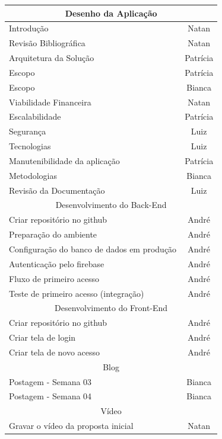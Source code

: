 \begin{apendicesenv}
\begin{quadro}[htb]
\begin{tabular}{|l|c|}
    \multicolumn{2}{|c|}{Desenho da Aplicação} \\ \hline
    Introdução  & Natan  \\ \hline 
    Revisão Bibliográfica  & Natan  \\ \hline 
    Arquitetura da Solução  & Patrícia   \\ \hline 
    Escopo  & Patrícia  \\ \hline 
    Escopo  & Bianca   \\ \hline 
    Viabilidade Financeira  & Natan  \\ \hline 
    Escalabilidade  & Patrícia  \\ \hline 
    Segurança  & Luiz  \\ \hline 
    Tecnologias  & Luiz \\ \hline 
    Manutenibilidade da aplicação  & Patrícia   \\ \hline 
    Metodologias  & Bianca  \\ \hline 
    Revisão da Documentação  & Luiz \\ \hline 
    
    \multicolumn{2}{|c|}{Desenvolvimento do Back-End} \\ \hline
    Criar repositório no github & André  \\ \hline 
    Preparação do ambiente & André  \\ \hline 
    Configuração do banco de dados em produção & André  \\ \hline 
    Autenticação pelo firebase & André  \\ \hline 
    Fluxo de primeiro acesso & André  \\ \hline 
    Teste de primeiro acesso (integração) & André  \\ \hline 
    
    \multicolumn{2}{|c|}{Desenvolvimento do Front-End} \\ \hline
    Criar repositório no github & André  \\ \hline 
    Criar tela de login & André  \\ \hline 
    Criar tela de novo acesso & André \\ \hline 
    
    \multicolumn{2}{|c|}{Blog} \\ \hline
    Postagem - Semana 03      & Bianca      \\ \hline
    Postagem - Semana 04      & Bianca      \\ \hline
    
    \multicolumn{2}{|c|}{Vídeo} \\ \hline
    Gravar o vídeo da proposta inicial & Natan  \\ \hline 
\end{tabular}
\end{quadro}
\FloatBarrier


\end{apendicesenv}
